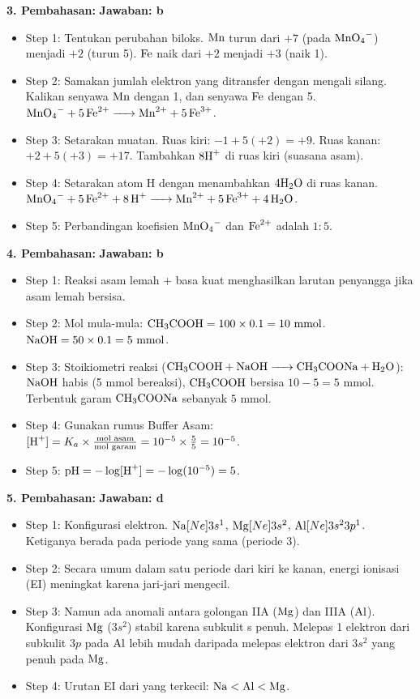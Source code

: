 \documentclass[12pt,a4paper]{article}
\begin{document}
\textbf{3. Pembahasan:} \hfill \textbf{Jawaban: b}
\begin{itemize}
    \item Step 1: Tentukan perubahan biloks. $\ce{Mn}$ turun dari $+7$ (pada $\ce{MnO4^-}$) menjadi $+2$ (turun 5). $\ce{Fe}$ naik dari $+2$ menjadi $+3$ (naik 1).
    \item Step 2: Samakan jumlah elektron yang ditransfer dengan mengali silang. Kalikan senyawa $\ce{Mn}$ dengan 1, dan senyawa $\ce{Fe}$ dengan 5. \\
    $\ce{MnO4^- + 5Fe^{2+} -> Mn^{2+} + 5Fe^{3+}}$.
    \item Step 3: Setarakan muatan. Ruas kiri: $-1 + 5(+2) = +9$. Ruas kanan: $+2 + 5(+3) = +17$. Tambahkan $8\ce{H+}$ di ruas kiri (suasana asam).
    \item Step 4: Setarakan atom H dengan menambahkan $4\ce{H2O}$ di ruas kanan. \\
    $\ce{MnO4^- + 5Fe^{2+} + 8H^+ -> Mn^{2+} + 5Fe^{3+} + 4H2O}$.
    \item Step 5: Perbandingan koefisien $\ce{MnO4^-}$ dan $\ce{Fe^{2+}}$ adalah $1 : 5$.
\end{itemize}

\textbf{4. Pembahasan:} \hfill \textbf{Jawaban: b}
\begin{itemize}
    \item Step 1: Reaksi asam lemah + basa kuat menghasilkan larutan penyangga jika asam lemah bersisa.
    \item Step 2: Mol mula-mula: $\ce{CH3COOH} = 100 \times 0.1 = 10 \text{ mmol}$. $\ce{NaOH} = 50 \times 0.1 = 5 \text{ mmol}$.
    \item Step 3: Stoikiometri reaksi ($\ce{CH3COOH + NaOH -> CH3COONa + H2O}$): \\
    $\ce{NaOH}$ habis (5 mmol bereaksi), $\ce{CH3COOH}$ bersisa $10 - 5 = 5 \text{ mmol}$. Terbentuk garam $\ce{CH3COONa}$ sebanyak $5 \text{ mmol}$.
    \item Step 4: Gunakan rumus Buffer Asam: $[\ce{H+}] = K_a \times \frac{\text{mol asam}}{\text{mol garam}} = 10^{-5} \times \frac{5}{5} = 10^{-5}$.
    \item Step 5: $\text{pH} = -\log[\ce{H+}] = -\log(10^{-5}) = 5$.
\end{itemize}

\textbf{5. Pembahasan:} \hfill \textbf{Jawaban: d}
\begin{itemize}
    \item Step 1: Konfigurasi elektron. $\ce{Na} [Ne] 3s^1$, $\ce{Mg} [Ne] 3s^2$, $\ce{Al} [Ne] 3s^2 3p^1$. Ketiganya berada pada periode yang sama (periode 3).
    \item Step 2: Secara umum dalam satu periode dari kiri ke kanan, energi ionisasi (EI) meningkat karena jari-jari mengecil.
    \item Step 3: Namun ada anomali antara golongan IIA ($\ce{Mg}$) dan IIIA ($\ce{Al}$). Konfigurasi $\ce{Mg}$ ($3s^2$) stabil karena subkulit s penuh. Melepas 1 elektron dari subkulit $3p$ pada $\ce{Al}$ lebih mudah daripada melepas elektron dari $3s^2$ yang penuh pada $\ce{Mg}$.
    \item Step 4: Urutan EI dari yang terkecil: $\ce{Na} < \ce{Al} < \ce{Mg}$.
\end{itemize}
\end{document}
